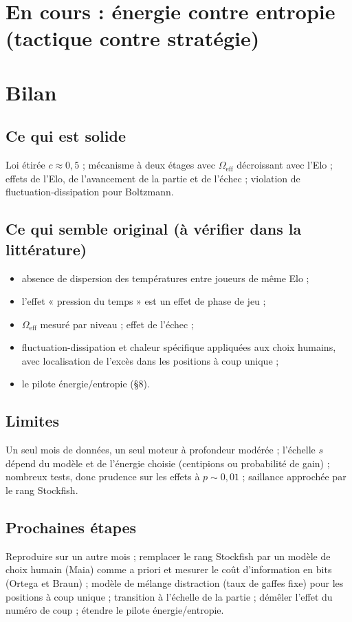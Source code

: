 \documentclass[11pt,a4paper]{article}
\begin{document}
\section{En cours : énergie contre entropie (tactique contre stratégie)}


\section{Bilan}

\subsection*{Ce qui est solide}
Loi étirée $c\approx 0{,}5$ ; mécanisme à deux étages avec $\Omega_\text{eff}$ décroissant avec l'Elo ;
effets de l'Elo, de l'avancement de la partie et de l'échec ; violation de fluctuation-dissipation pour
Boltzmann.

\subsection*{Ce qui semble original (à vérifier dans la littérature)}
\begin{itemize}
  \item absence de dispersion des températures entre joueurs de même Elo ;
  \item l'effet « pression du temps » est un effet de phase de jeu ;
  \item $\Omega_\text{eff}$ mesuré par niveau ; effet de l'échec ;
  \item fluctuation-dissipation et chaleur spécifique appliquées aux choix humains, avec localisation de l'excès
        dans les positions à coup unique ;
  \item le pilote énergie/entropie (§8).
\end{itemize}

\subsection*{Limites}
Un seul mois de données, un seul moteur à profondeur modérée ; l'échelle $s$ dépend du modèle et de l'énergie
choisie (centipions ou probabilité de gain) ; nombreux tests, donc prudence sur les effets à $p\sim 0{,}01$ ;
saillance approchée par le rang Stockfish.

\subsection*{Prochaines étapes}
Reproduire sur un autre mois ; remplacer le rang Stockfish par un modèle de choix humain (Maia) comme
\og a priori\fg{} et mesurer le coût d'information en bits (Ortega et Braun) ; modèle de mélange
\og distraction\fg{} (taux de gaffes fixe) pour les positions à coup unique ; transition à l'échelle de la partie ; démêler l'effet du numéro de coup ;
étendre le pilote énergie/entropie.
\end{document}
